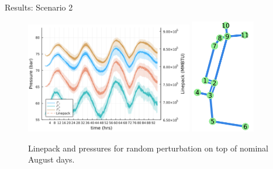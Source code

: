 \begin{frame}{Results: Scenario 2}
  \begin{figure}
    \centering
    \includegraphics[width=0.65\textwidth]{ScenarioResults/scen2.png}
    \includegraphics[width=0.25\textwidth]{reducedModel.png}
    \caption{Linepack and pressures for random perturbation on top of nominal August days.}
  \end{figure}
\end{frame}

